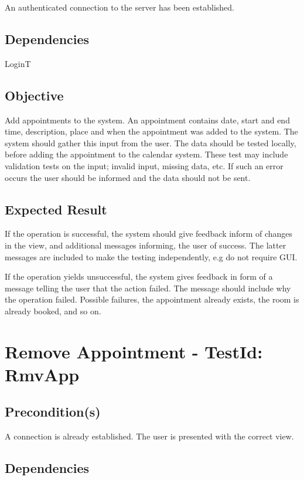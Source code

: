 \documentclass{article}
\begin{document}
An authenticated connection to the server has been established.

\subsection{Dependencies}

LoginT

\subsection{Objective}

Add appointments to the system. An appointment contains date, start and end
time, description, place and when the appointment was added to the system.
The system should gather this input from the user. The data should be tested
locally, before adding the appointment to the calendar system. These test
may include validation tests on the input; invalid input, missing data, etc.
If such an error occurs the user should be informed and the data should not
be sent.

\subsection{Expected Result}

If the operation is successful, the system should give feedback inform of
changes in the view, and additional messages informing, the user of success.
The latter messages are included to make the testing independently, e.g do
not require GUI.

If the operation yields unsuccessful, the system gives feedback in form of a
message telling the user that the action failed. The message should include
why the operation failed. Possible failures, the appointment already exists,
the room is already booked, and so on. \newpage

\section{Remove Appointment - TestId: RmvApp}

\subsection{Precondition(s)}

A connection is already established. The user is presented with the correct
view.

\subsection{Dependencies}
\end{document}
